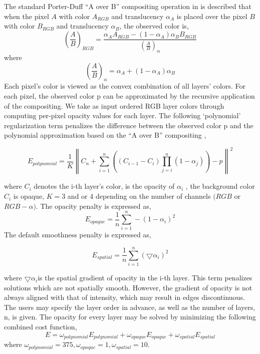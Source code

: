 The standard Porter-Duff “A over B” compositing operation in \cite{porter1984compositing} is described that when the pixel $A$ with color $A_{RGB}$ and translucency $\alpha_{A}$ is placed over the pixel $B$ with color $B_{RGB}$ and translucency $\alpha_{B}$, the observed color is, \\
\begin{equation} \label{eq:aoverb}
  \left ( \frac{A}{B} \right )_{RGB}=\frac{\alpha_{A}A_{RGB}-(1-\alpha_{A})\alpha_{B}B_{RGB}}{\left ( \frac{A}{B} \right )_{\alpha}} 
\end{equation} 
where 
\[\left ( \frac{A}{B} \right )_{\alpha} = \alpha_{A}+(1-\alpha_{A})\alpha_{B} \]
Each pixel’s color is viewed as the convex combination of all layers’ colors. For each pixel, the observed color p can be approximated by the recursive application of the compositing. We take as input ordered RGB layer colors through computing per-pixel opacity values for each layer. The following ‘polynomial’ regularization term penalizes the difference between the observed color p and the polynomial approximation based on the “A over B” compositing \cite{porter1984compositing},

\[E_{polynomial}=\frac{1}{K}\left \|    C_{n}+\sum_{i=1}^{n}  \left ( \left ( C_{i-1}-C_{i} \right ) \prod_{j=i}^{n}(1-\alpha_{j}) \right )-p  \right \|^{2}\]

where $C_{i}$ denotes the i-th layer’s color, is the opacity of $\alpha_{i}$ , the background color $C_{i}$ is opaque, $K=3$ and or 4 depending on the number of channels $(RGB$ or $RGB-\alpha)$. The opacity penalty is expressed as,
\[E_{opaque}=\frac{1}{n}\sum_{i=1}^n-(1-\alpha_{i})^2\]
The default smoothness penalty is expressed as,

\[E_{spatial}=\frac{1}{n}\sum_{i=1}^n( \bigtriangledown  \alpha_{i})^2\]

where $ \bigtriangledown  \alpha_{i}$is the spatial gradient of opacity in the i-th layer. This term penalizes solutions which are not spatially smooth. However, the gradient of opacity is not always aligned with that of intensity, which may result in edges discontinuous.
The users may specify the layer order in advance, as well as the number of layers, n, is given. The opacity for every layer may be solved by minimizing the following combined cost function,
\begin{equation}
E=\omega_{polynomial}E_{polynomial}+\omega_{opaque}E_{opaque}+\omega_{spatial}E_{spatial}
\label{eq:layer1}
\end{equation} 
where $\omega_{polynomial} = 375 ,\omega_{opaque}=1 , \omega_{spatial}=10$. 

